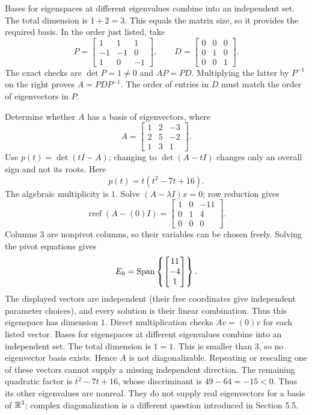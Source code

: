 Bases for eigenspaces at different eigenvalues combine into an independent set. The total dimension is $1+2=3$.
This equals the matrix size, so it provides the required basis. In the order just listed, take
\[P=\begin{bmatrix}1&1&1\\-1&-1&0\\1&0&-1\end{bmatrix},\qquad D=\begin{bmatrix}0&0&0\\0&1&0\\0&0&1\end{bmatrix}.\]
The exact checks are $\det P=1\ne0$ and $AP=PD$. Multiplying the latter by $P^{-1}$ on the right proves $A=PDP^{-1}$. The order of entries in $D$ must match the order of eigenvectors in $P$.


\goal Determine whether $A$ has a basis of eigenvectors, where
\[A=\begin{bmatrix}1&2&-3\\2&5&-2\\1&3&1\end{bmatrix}.\]
Use $p(t)=\det(tI-A)$; changing to $\det(A-tI)$ changes only an overall sign and not its roots. Here
\[p(t)=t \left(t^{2} - 7 t + 16\right).\]
The algebraic multiplicity is $1$. Solve $(A-\lambda I)x=0$; row reduction gives
\[\operatorname{rref}(A-(0)I)=\begin{bmatrix}1&0&-11\\0&1&4\\0&0&0\end{bmatrix}.\]
Columns 3 are nonpivot columns, so their variables can be chosen freely. Solving the pivot equations gives
\[E_{0}=\operatorname{Span}\left\{\begin{bmatrix}11\\-4\\1\end{bmatrix}\right\}.\]
The displayed vectors are independent (their free coordinates give independent parameter choices), and every solution is their linear combination. Thus this eigenspace has dimension $1$. Direct multiplication checks $Av=(0)v$ for each listed vector.
Bases for eigenspaces at different eigenvalues combine into an independent set. The total dimension is $1=1$.
This is smaller than $3$, so no eigenvector basis exists. Hence $A$ is not diagonalizable. Repeating or rescaling one of these vectors cannot supply a missing independent direction.
The remaining quadratic factor is $t^2-7t+16$, whose discriminant is $49-64=-15<0$. Thus its other eigenvalues are nonreal. They do not supply real eigenvectors for a basis of $\mathbb{R}^3$; complex diagonalization is a different question introduced in Section 5.5.

